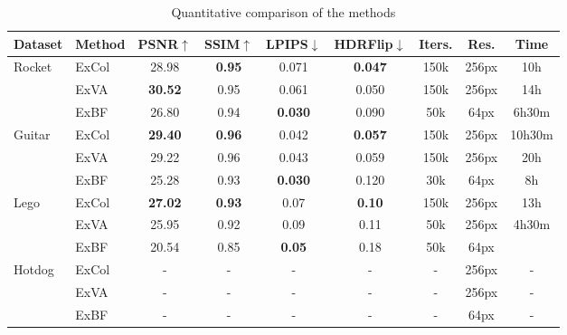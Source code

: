 \begingroup
\begin{table*}[!htb]
    \centering
    \caption{Quantitative comparison of the methods
    }
    \label{tab:colocated_metrics}
    \begin{tabular*}{\textwidth}{ l | l | c c c c | c c c }
    	Dataset & Method & PSNR$\uparrow$ & SSIM$\uparrow$ & LPIPS$\downarrow$ & HDRFlip$\downarrow$ & Iters. & Res. & Time \\
        \midrule
        \multirow{3}{*}{Rocket}
        & ExCol & 28.98 & \textbf{0.95} & 0.071 & \textbf{0.047} & 150k & 256px & 10h \\
        & ExVA & \textbf{30.52} & 0.95 & 0.061 & 0.050 & 150k & 256px & 14h \\
        & ExBF & 26.80 & 0.94 & \textbf{0.030} & 0.090 & 50k & 64px & 6h30m \\
        \midrule
        \multirow{3}{*}{Guitar}
        & ExCol & \textbf{29.40} & \textbf{0.96} & 0.042 & \textbf{0.057} & 150k & 256px & 10h30m \\
        & ExVA & 29.22 & 0.96 & 0.043 & 0.059 & 150k & 256px & 20h \\
        & ExBF & 25.28 & 0.93 & \textbf{0.030} & 0.120 & 30k & 64px & 8h \\
        \midrule
        \multirow{3}{*}{Lego}
        & ExCol & \textbf{27.02} & \textbf{0.93} & 0.07 & \textbf{0.10} & 150k & 256px & 13h \\
        & ExVA & 25.95 & 0.92 & 0.09 & 0.11 & 50k & 256px & 4h30m \\
        & ExBF & 20.54 & 0.85 & \textbf{0.05} & 0.18 & 50k & 64px & \\
        \midrule
        \multirow{3}{*}{Hotdog}
        & ExCol & - & - & - & - & - & 256px & - \\
        & ExVA & - & - & - & - & - & 256px & - \\
        & ExBF & - & - & - & - & - & 64px & - \\
    \end{tabular*}
\end{table*}
\endgroup

